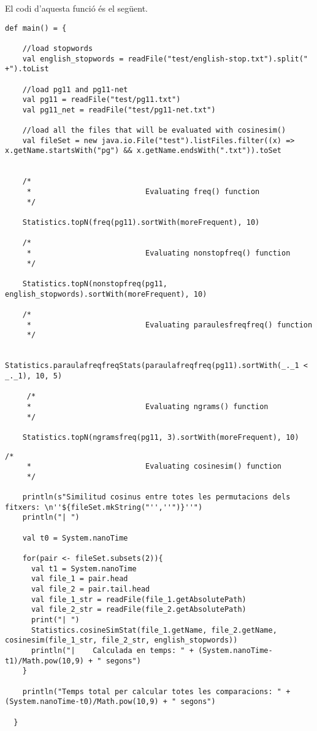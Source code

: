 \documentclass{report}
\begin{document}
\newpage

El codi d'aquesta funció és el següent.

\begin{lstlisting}[style=scalaHighlight]
def main() = {

    //load stopwords
    val english_stopwords = readFile("test/english-stop.txt").split(" +").toList

    //load pg11 and pg11-net
    val pg11 = readFile("test/pg11.txt")
    val pg11_net = readFile("test/pg11-net.txt")

    //load all the files that will be evaluated with cosinesim()
    val fileSet = new java.io.File("test").listFiles.filter((x) => x.getName.startsWith("pg") && x.getName.endsWith(".txt")).toSet


    /*
     * 							Evaluating freq() function
     */

    Statistics.topN(freq(pg11).sortWith(moreFrequent), 10)

    /*
     * 							Evaluating nonstopfreq() function
     */

    Statistics.topN(nonstopfreq(pg11, english_stopwords).sortWith(moreFrequent), 10)

    /*
     * 							Evaluating paraulesfreqfreq() function
     */

    Statistics.paraulafreqfreqStats(paraulafreqfreq(pg11).sortWith(_._1 < _._1), 10, 5)

     /*
     * 							Evaluating ngrams() function
     */

    Statistics.topN(ngramsfreq(pg11, 3).sortWith(moreFrequent), 10)
\end{lstlisting}

\newpage

\begin{lstlisting}[style=scalaHighlight]
    /*
     * 							Evaluating cosinesim() function
     */

    println(s"Similitud cosinus entre totes les permutacions dels fitxers: \n''${fileSet.mkString("'',''")}''")
    println("| ")

    val t0 = System.nanoTime

    for(pair <- fileSet.subsets(2)){
      val t1 = System.nanoTime
      val file_1 = pair.head
      val file_2 = pair.tail.head
      val file_1_str = readFile(file_1.getAbsolutePath)
      val file_2_str = readFile(file_2.getAbsolutePath)
      print("| ")
      Statistics.cosineSimStat(file_1.getName, file_2.getName, cosinesim(file_1_str, file_2_str, english_stopwords))
      println("|	Calculada en temps: " + (System.nanoTime-t1)/Math.pow(10,9) + " segons")
    }

    println("Temps total per calcular totes les comparacions: " + (System.nanoTime-t0)/Math.pow(10,9) + " segons")

  }
\end{lstlisting}
\end{document}
